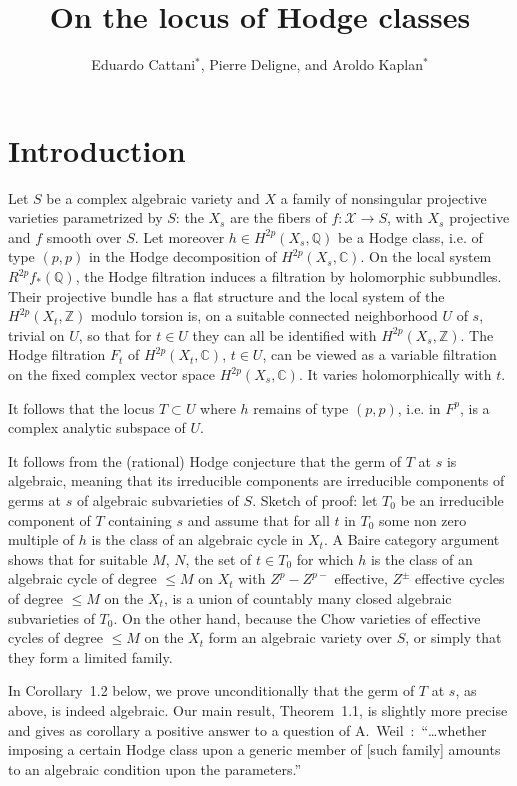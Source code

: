 \documentclass[11pt,a4paper]{article}
\title{On the locus of Hodge classes}
\author{Eduardo Cattani$^*$, Pierre Deligne, and Aroldo Kaplan$^*$}
\date{}
\theoremstyle{plain}
\theoremstyle{definition}
\begin{document}
\maketitle
{}

\section{Introduction}

Let $S$ be a complex algebraic variety and $X$ a family of nonsingular projective varieties parametrized by $S$: the $X_s$ are the fibers of $f:\mathcal{X}\to S$, with $X_s$ projective and $f$ smooth over $S$. Let moreover $h\in H^{2p}(X_s,\mathbb{Q})$ be a Hodge class, i.e. of type $(p,p)$ in the Hodge decomposition of $H^{2p}(X_s,\mathbb{C})$. On the local system $R^{2p}f_*(\mathbb{Q})$, the Hodge filtration induces a filtration by holomorphic subbundles. Their projective bundle has a flat structure and the local system of the $H^{2p}(X_t,\mathbb{Z})$ modulo torsion is, on a suitable connected neighborhood $U$ of $s$, trivial on $U$, so that for $t\in U$ they can all be identified with $H^{2p}(X_s,\mathbb{Z})$. The Hodge filtration $F_t$ of $H^{2p}(X_t,\mathbb{C})$, $t\in U$, can be viewed as a variable filtration on the fixed complex vector space $H^{2p}(X_s,\mathbb{C})$. It varies holomorphically with $t$.

It follows that the locus $T\subset U$ where $h$ remains of type $(p,p)$, i.e. in $F^p$, is a complex analytic subspace of $U$.

It follows from the (rational) Hodge conjecture that the germ of $T$ at $s$ is algebraic, meaning that its irreducible components are irreducible components of germs at $s$ of algebraic subvarieties of $S$. Sketch of proof: let $T_0$ be an irreducible component of $T$ containing $s$ and assume that for all $t$ in $T_0$ some non zero multiple of $h$ is the class of an algebraic cycle in $X_t$. A Baire category argument shows that for suitable $M$, $N$, the set of $t\in T_0$ for which $h$ is the class of an algebraic cycle of degree $\leq M$ on $X_t$ with $Z^p - Z^{p-}$ effective, $Z^{\pm}$ effective cycles of degree $\leq M$ on the $X_t$, is a union of countably many closed algebraic subvarieties of $T_0$. On the other hand, because the Chow varieties of effective cycles of degree $\leq M$ on the $X_t$ form an algebraic variety over $S$, or simply that they form a limited family.

In Corollary~1.2 below, we prove unconditionally that the germ of $T$ at $s$, as above, is indeed algebraic. Our main result, Theorem~1.1, is slightly more precise and gives as corollary a positive answer to a question of A.~Weil~\cite{weil}:\ ``\dots whether imposing a certain Hodge class upon a generic member of [such family] amounts to an algebraic condition upon the parameters.''
\end{document}
